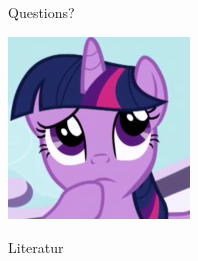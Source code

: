 \documentclass[notes=hide,yellow]{beamer}
\begin{document}
\subsection*{}
\begin{frame}
	\begin{center}
	\large Questions?
	\end{center}
	
	\begin{center}
	\includegraphics[scale=0.8]{questions.jpg}
	\end{center}
\end{frame}

\begin{frame}{Literatur}
	
		
\end{frame}
\end{document}
